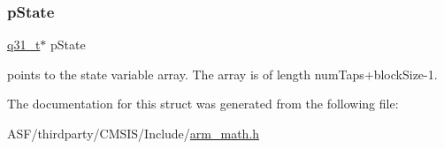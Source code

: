 \subsubsection{\texorpdfstring{pState}{pState}}
{\footnotesize\ttfamily \mbox{\hyperlink{arm__math_8h_adc89a3547f5324b7b3b95adec3806bc0}{q31\+\_\+t}}$\ast$ p\+State}

points to the state variable array. The array is of length num\+Taps+block\+Size-\/1. 

The documentation for this struct was generated from the following file\+:\begin{DoxyCompactItemize}
\item 
A\+S\+F/thirdparty/\+C\+M\+S\+I\+S/\+Include/\mbox{\hyperlink{arm__math_8h}{arm\+\_\+math.\+h}}\end{DoxyCompactItemize}
